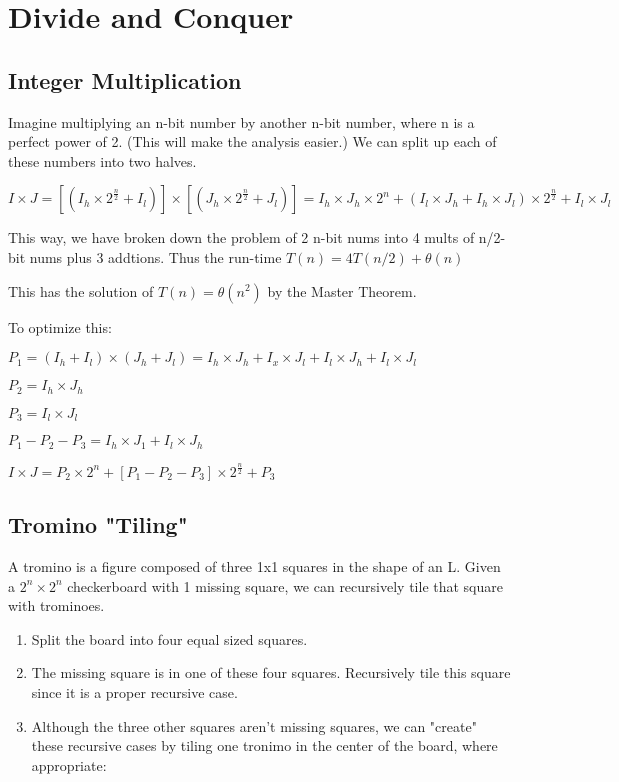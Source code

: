 \section{Divide and Conquer}
\subsection*{Integer Multiplication}

Imagine multiplying an n-bit number by another n-bit
number, where n is a perfect power of 2.
(This will make the analysis easier.)
We can split up each of these numbers into two halves. 

$I\times J=[(I_h\times 2^{\frac{n}{2}}+I_l)]\times[(J_h\times 2^{\frac{n}{2}}+J_l)]=%
I_h\times J_h\times 2^n+(I_l\times J_h+I_h\times J_l)\times 2^{\frac{n}{2}}+I_l\times J_l$

This way, we have broken down the problem of 2 n-bit nums into 4 mults of
n/2-bit nums plus 3 addtions.
Thus the run-time $T(n)=4T(n/2)+\theta(n)$

This has the solution of $T(n)=\theta(n^2)$ by the Master Theorem.

To optimize this:

$P_1=(I_h+I_l)\times(J_h+J_l)=I_h\times J_h+I_x\times J_l+I_l\times J_h+I_l\times J_l$


$P_2=I_h\times J_h$

$P_3=I_l\times J_l$

$P_1-P_2-P_3=I_h\times J_1+I_l\times J_h$

$I\times J=P_2\times 2^n+[P_1-P_2-P_3]\times 2^{\frac{n}{2}}+P_3$

\subsection*{Tromino "Tiling"}
A tromino is a figure composed of three 1x1 squares in the shape of an L.
Given a $2^n\times 2^n$ checkerboard with 1 missing square, we can recursively tile that 
square with trominoes.

\begin{enumerate}
    \item Split the board into four equal sized squares.
    \item The missing square is in one of these four squares.
        Recursively tile this square since it is a proper recursive case.
    \item Although the three other squares aren't missing squares, we can "create"
        these recursive cases by tiling one tronimo in the center of the board,
        where appropriate:
\end{enumerate}


